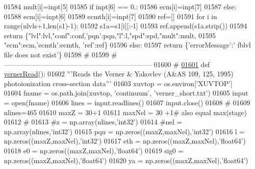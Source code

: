 \begin{DoxyCode}
{{{{{{{{{{{{{{{01584             mult[i]=inpt[5]
01585             \textcolor{keywordflow}{if} inpt[6] == 0.:
01586                 ecm[i]=inpt[7]
01587             \textcolor{keywordflow}{else}:
01588                 ecm[i]=inpt[6]
01589                 ecmth[i]=inpt[7]
01590         ref=[]
01591         \textcolor{keywordflow}{for} i \textcolor{keywordflow}{in} range(nlvls+1,len(s1)-1):
01592             s1a=s1[i][:-1]
01593             ref.append(s1a.strip())
01594         \textcolor{keywordflow}{return} \{\textcolor{stringliteral}{"lvl"}:lvl,\textcolor{stringliteral}{"conf"}:conf,\textcolor{stringliteral}{'pqn'}:pqn,\textcolor{stringliteral}{"l"}:l,\textcolor{stringliteral}{"spd"}:spd,\textcolor{stringliteral}{"mult"}:mult,
01595             \textcolor{stringliteral}{"ecm"}:ecm,\textcolor{stringliteral}{'ecmth'}:ecmth, \textcolor{stringliteral}{'ref'}:ref\}
01596     \textcolor{keywordflow}{else}:
01597         \textcolor{keywordflow}{return} \{\textcolor{stringliteral}{'errorMessage'}:\textcolor{stringliteral}{' fblvl file does not exist'}\}
01598     \textcolor{comment}{#}
01599     \textcolor{comment}{# -----------------------------------------------------------------}
01600     \textcolor{comment}{#}
\hypertarget{__chianti__tools_8py_source_l01601}{}\hyperlink{namespacepyneb_1_1utils_1_1__chianti__tools_addacad8fe4cf3dff7f457b8b4a58054f}{01601} \textcolor{keyword}{def }\hyperlink{namespacepyneb_1_1utils_1_1__chianti__tools_addacad8fe4cf3dff7f457b8b4a58054f}{vernerRead}():
01602     \textcolor{stringliteral}{'''Reads the Verner & Yakovlev (A&AS 109, 125, 1995) photoionization cross-section data'''}
01603     xuvtop = os.environ[\textcolor{stringliteral}{'XUVTOP'}]
01604     fname = os.path.join(xuvtop, \textcolor{stringliteral}{'continuum'}, \textcolor{stringliteral}{'verner\_short.txt'})
01605     input = open(fname)
01606     lines = input.readlines()
01607     input.close()
01608     \textcolor{comment}{#}
01609     nlines=465
01610     maxZ = 30+1
01611     maxNel = 30 +1\textcolor{comment}{# also equal max(stage)}
01612     \textcolor{comment}{#}
01613     \textcolor{comment}{#z = np.array(nlines,'int32')}
01614     \textcolor{comment}{#nel = np.array(nlines,'int32')}
01615     pqn = np.zeros((maxZ,maxNel),\textcolor{stringliteral}{'int32'})
01616     l = np.zeros((maxZ,maxNel),\textcolor{stringliteral}{'int32'})
01617     eth = np.zeros((maxZ,maxNel),\textcolor{stringliteral}{'float64'})
01618     e0 = np.zeros((maxZ,maxNel),\textcolor{stringliteral}{'float64'})
01619     sig0 = np.zeros((maxZ,maxNel),\textcolor{stringliteral}{'float64'})
01620     ya = np.zeros((maxZ,maxNel),\textcolor{stringliteral}{'float64'})
}}}}}}}}}}}}}}}
\end{DoxyCode}

